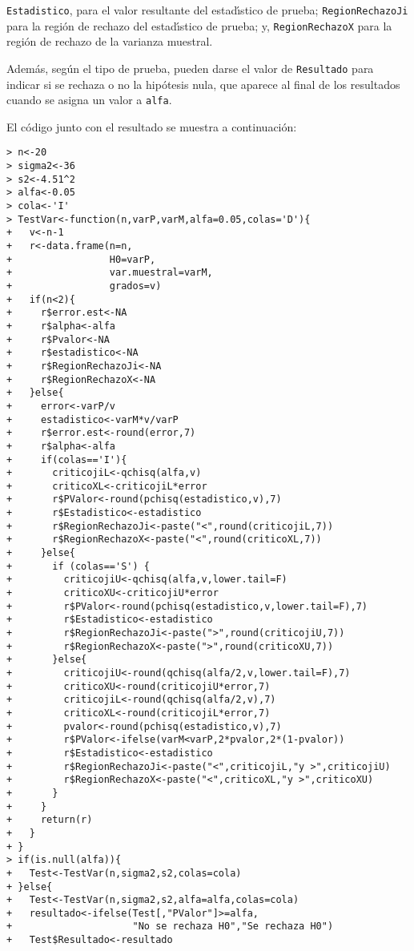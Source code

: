 \begin{solucion}
 \texttt{Estadistico}, para el valor resultante
 del estad\'{\i}stico de prueba;
 \texttt{RegionRechazoJi} para la regi\'on de rechazo del estad\'{\i}stico
 de prueba;
 y, \texttt{RegionRechazoX} para la regi\'on de rechazo de la varianza muestral.
 \par 
 Adem\'as, seg\'un el tipo de prueba, pueden darse el valor
 de \texttt{Resultado} para indicar si se rechaza o no
 la hip\'otesis nula, que aparece al final de los resultados
 cuando se asigna un valor a \texttt{alfa}.
 \par 
 El c\'odigo junto con el resultado se muestra a continuaci\'on:
 \begin{verbatim}
> n<-20
> sigma2<-36
> s2<-4.51^2
> alfa<-0.05
> cola<-'I'
> TestVar<-function(n,varP,varM,alfa=0.05,colas='D'){
+   v<-n-1
+   r<-data.frame(n=n,
+                 H0=varP,
+                 var.muestral=varM,
+                 grados=v)
+   if(n<2){
+     r$error.est<-NA
+     r$alpha<-alfa
+     r$Pvalor<-NA
+     r$estadistico<-NA
+     r$RegionRechazoJi<-NA
+     r$RegionRechazoX<-NA
+   }else{
+     error<-varP/v
+     estadistico<-varM*v/varP
+     r$error.est<-round(error,7)
+     r$alpha<-alfa
+     if(colas=='I'){
+       criticojiL<-qchisq(alfa,v)
+       criticoXL<-criticojiL*error
+       r$PValor<-round(pchisq(estadistico,v),7)
+       r$Estadistico<-estadistico
+       r$RegionRechazoJi<-paste("<",round(criticojiL,7))
+       r$RegionRechazoX<-paste("<",round(criticoXL,7))
+     }else{
+       if (colas=='S') {
+         criticojiU<-qchisq(alfa,v,lower.tail=F)
+         criticoXU<-criticojiU*error
+         r$PValor<-round(pchisq(estadistico,v,lower.tail=F),7)
+         r$Estadistico<-estadistico
+         r$RegionRechazoJi<-paste(">",round(criticojiU,7))
+         r$RegionRechazoX<-paste(">",round(criticoXU,7))
+       }else{
+         criticojiU<-round(qchisq(alfa/2,v,lower.tail=F),7)
+         criticoXU<-round(criticojiU*error,7)
+         criticojiL<-round(qchisq(alfa/2,v),7)
+         criticoXL<-round(criticojiL*error,7)
+         pvalor<-round(pchisq(estadistico,v),7)
+         r$PValor<-ifelse(varM<varP,2*pvalor,2*(1-pvalor))
+         r$Estadistico<-estadistico
+         r$RegionRechazoJi<-paste("<",criticojiL,"y >",criticojiU)
+         r$RegionRechazoX<-paste("<",criticoXL,"y >",criticoXU)
+       }
+     }
+     return(r)
+   }
+ }
> if(is.null(alfa)){
+   Test<-TestVar(n,sigma2,s2,colas=cola)
+ }else{
+   Test<-TestVar(n,sigma2,s2,alfa=alfa,colas=cola)
+   resultado<-ifelse(Test[,"PValor"]>=alfa,
+                     "No se rechaza H0","Se rechaza H0")
+   Test$Resultado<-resultado

\end{verbatim}
\end{solucion}
